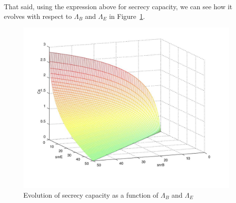 \documentclass[a4paper,12pt,titlepage]{article}
\begin{document}
That said, using the expression above for secrecy capacity, we can see how it
evolves with respect to $\Lambda_B$ and $\Lambda_E$ in
Figure~\ref{fig:awgn_mesh_cs}.

\begin{figure}[h]
  \centering
  \includegraphics[scale=0.8]{awgn_mesh_cs.jpg}
  \caption{Evolution of secrecy capacity as a function of
  $\Lambda_B$ and $\Lambda_E$}
  \label{fig:awgn_mesh_cs}
\end{figure}
\end{document}
